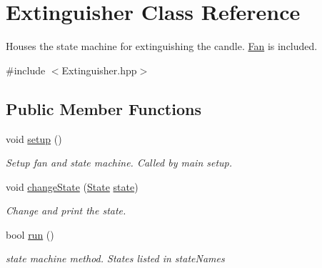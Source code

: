 \hypertarget{classExtinguisher}{\section{Extinguisher Class Reference}
\label{classExtinguisher}
}


Houses the state machine for extinguishing the candle. \hyperlink{classFan}{Fan} is included.  




{\ttfamily \#include $<$Extinguisher.\-hpp$>$}

\subsection*{Public Member Functions}
\begin{DoxyCompactItemize}
\item 
void \hyperlink{classExtinguisher_a5a6f4652de68d87d3c94a5133770036f}{setup} ()
\begin{DoxyCompactList}\small\item\em Setup fan and state machine. Called by main setup. \end{DoxyCompactList}\item 
void \hyperlink{classExtinguisher_add162f2794a81915e50bdde84f582ab9}{change\-State} (\hyperlink{classExtinguisher_a969a7cce3382fc5d67f687540896e3ab}{State} \hyperlink{classExtinguisher_aa67c13dc091e5dc2c054d53f7fcae69b}{state})
\begin{DoxyCompactList}\small\item\em Change and print the state. \end{DoxyCompactList}\item 
bool \hyperlink{classExtinguisher_ab11afd0f55af4485a1a4f369c7743a40}{run} ()
\begin{DoxyCompactList}\small\item\em state machine method. States listed in state\-Names \end{DoxyCompactList}\end{DoxyCompactItemize}
